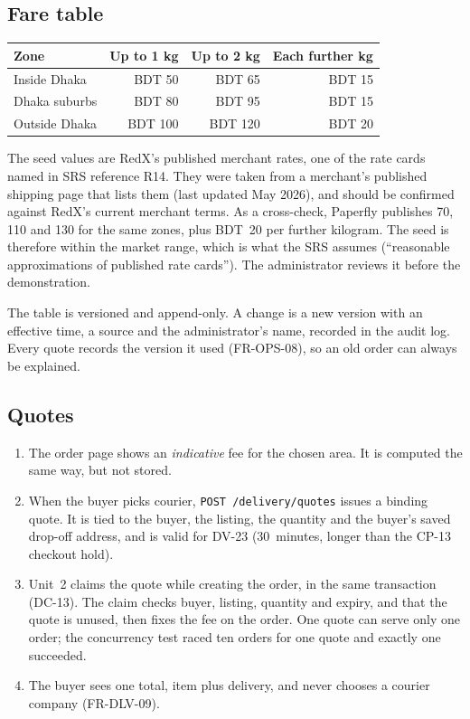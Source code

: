 \documentclass[11pt,a4paper]{article}
\begin{document}
\subsection{Fare table}
\begin{center}
\small
\begin{tabular}{@{}lrrr@{}}
\toprule
\textbf{Zone} & \textbf{Up to 1 kg} & \textbf{Up to 2 kg} & \textbf{Each further kg} \\ \midrule
Inside Dhaka & BDT 50 & BDT 65 & BDT 15 \\
Dhaka suburbs & BDT 80 & BDT 95 & BDT 15 \\
Outside Dhaka & BDT 100 & BDT 120 & BDT 20 \\
\bottomrule
\end{tabular}
\end{center}
The seed values are RedX's published merchant rates, one of the rate cards named in SRS reference R14. They were taken from a merchant's published shipping page that lists them (last updated May 2026), and should be confirmed against RedX's current merchant terms. As a cross-check, Paperfly publishes 70, 110 and 130 for the same zones, plus BDT~20 per further kilogram. The seed is therefore within the market range, which is what the SRS assumes (``reasonable approximations of published rate cards''). The administrator reviews it before the demonstration.

The table is versioned and append-only. A change is a new version with an effective time, a source and the administrator's name, recorded in the audit log. Every quote records the version it used (FR-OPS-08), so an old order can always be explained.

\subsection{Quotes}
\begin{enumerate}[nosep]
  \item The order page shows an \emph{indicative} fee for the chosen area. It is computed the same way, but not stored.
  \item When the buyer picks courier, \texttt{POST /delivery/quotes} issues a binding quote. It is tied to the buyer, the listing, the quantity and the buyer's saved drop-off address, and is valid for DV-23 (30~minutes, longer than the CP-13 checkout hold).
  \item Unit~2 claims the quote while creating the order, in the same transaction (DC-13). The claim checks buyer, listing, quantity and expiry, and that the quote is unused, then fixes the fee on the order. One quote can serve only one order; the concurrency test raced ten orders for one quote and exactly one succeeded.
  \item The buyer sees one total, item plus delivery, and never chooses a courier company (FR-DLV-09).
\end{enumerate}
\end{document}
